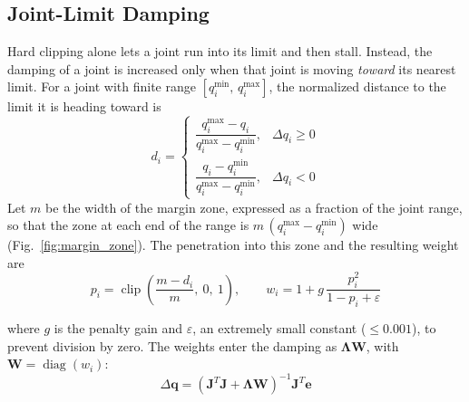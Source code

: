 \documentclass[12pt,a4paper]{article}
\begin{document}
\newpage
\subsection*{Joint-Limit Damping}
Hard clipping alone lets a joint run into its limit and then stall. Instead, the damping of a joint is increased only when that joint is moving \emph{toward} its nearest limit. For a joint with finite range $[q_i^{\min},\,q_i^{\max}]$, the normalized distance to the limit it is heading toward is
\begin{equation}
    d_i =
    \begin{cases}
        \dfrac{q_i^{\max}-q_i}{q_i^{\max}-q_i^{\min}}, & \Delta q_i \ge 0\\[2ex]
        \dfrac{q_i-q_i^{\min}}{q_i^{\max}-q_i^{\min}}, & \Delta q_i < 0
    \end{cases}
\end{equation}
Let $m$ be the width of the margin zone, expressed as a fraction of the joint range, so that the zone at each end of the range is $m\,(q_i^{\max}-q_i^{\min})$ wide (Fig.~\ref{fig:margin_zone}). The penetration into this zone and the resulting weight are
\begin{equation}
    p_i = \operatorname{clip}\!\left(\frac{m-d_i}{m},\ 0,\ 1\right),
    \qquad
    w_i = 1 + g\,\frac{p_i^{2}}{1-p_i+\varepsilon}
    \label{eq:limit_weight}
\end{equation}

where $g$ is the penalty gain and $\varepsilon$, an extremely small constant ($\leq 0.001$), to prevent division by zero. The weights enter the damping as $\boldsymbol{\Lambda}\mathbf{W}$, with $\mathbf{W}=\operatorname{diag}(w_i)$:
\begin{equation}
    \Delta\mathbf{q}
    = \left(\mathbf{J}^{T}\mathbf{J} + \boldsymbol{\Lambda}\mathbf{W}\right)^{-1}\mathbf{J}^{T}\mathbf{e}
\end{equation}
\end{document}
